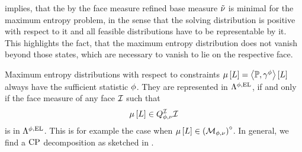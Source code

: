 
 implies, that the by the face measure refined base measure $\tilde{\nu}$ is minimal for the maximum entropy problem, in the sense that the solving distribution is positive with respect to it and all feasible distributions have to be representable by it.
This highlights the fact, that the maximum entropy distribution does not vanish beyond those states, which are necessary to vanish to lie on the respective face. %



Maximum entropy distributions with respect to constraints $\mu\left[L\right]=\left\langle \mathbb{P},\gamma^{\phi}\right\rangle \left[ L \right]$ always have the sufficient statistic $\phi$.
They are represented in $\Lambda^{\phi,\mathrm{EL}}$, if and only if the face measure of any face $\mathcal{I}$ such that
\begin{align*}
    \mu\left[L\right] \in Q^{\mathcal{I}}_{\phi,\nu}{\mathcal{I}}
\end{align*}
is in $\Lambda^{\phi,\mathrm{EL}}$.
This is for example the case when $\mu\left[L\right]\in{\left(\mathcal{M}_{\phi,\nu}\right)}^{\circ}$.
In general, we find a $\mathrm{CP}$ decomposition as sketched in .

